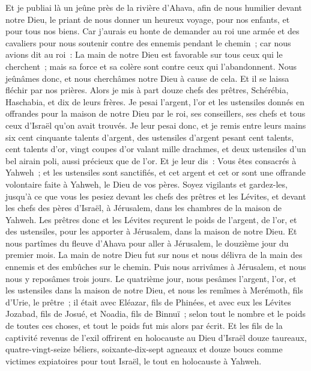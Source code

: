 \begin{multicols}{2}
Et je publiai là un jeûne près de la rivière d'Ahava, afin de nous humilier devant notre Dieu, le priant de nous donner un heureux voyage, pour nos enfants, et pour tous nos biens.
Car j'aurais eu honte de demander au roi une armée et des cavaliers pour nous soutenir contre des ennemis pendant le chemin~; car nous avions dit au roi~: La main de notre Dieu est favorable sur tous ceux qui le cherchent~; mais sa force et sa colère sont contre ceux qui l'abandonnent.
Nous jeûnâmes donc, et nous cherchâmes notre Dieu à cause de cela. Et il se laissa fléchir par nos prières.
Alors je mis à part douze chefs des prêtres, Schérébia, Haschabia, et dix de leurs frères.
Je pesai l'argent, l'or et les ustensiles donnés en offrandes pour la maison de notre Dieu par le roi, ses conseillers, ses chefs et tous ceux d'Israël qu'on avait trouvés.
Je leur pesai donc, et je remis entre leurs mains six cent cinquante talents d'argent, des ustensiles d'argent pesant cent talents, cent talents d'or,
vingt coupes d'or valant mille drachmes, et deux ustensiles d'un bel airain poli, aussi précieux que de l'or.
Et je leur dis~: Vous êtes consacrés à Yahweh~; et les ustensiles sont sanctifiés, et cet argent et cet or sont une offrande volontaire faite à Yahweh, le Dieu de vos pères.
Soyez vigilants et gardez-les, jusqu'à ce que vous les pesiez devant les chefs des prêtres et les Lévites, et devant les chefs des pères d'Israël, à Jérusalem, dans les chambres de la maison de Yahweh.
Les prêtres donc et les Lévites reçurent le poids de l'argent, de l'or, et des ustensiles, pour les apporter à Jérusalem, dans la maison de notre Dieu.
Et nous partîmes du fleuve d'Ahava pour aller à Jérusalem, le douzième jour du premier mois. La main de notre Dieu fut sur nous et nous délivra de la main des ennemis et des embûches sur le chemin.
Puis nous arrivâmes à Jérusalem, et nous nous y reposâmes trois jours.
Le quatrième jour, nous pesâmes l'argent, l'or, et les ustensiles dans la maison de notre Dieu, et nous les remîmes à Merémoth, fils d'Urie, le prêtre~; il était avec Eléazar, fils de Phinées, et avec eux les Lévites Jozabad, fils de Josué, et Noadia, fils de Binnuï~;
selon tout le nombre et le poids de toutes ces choses, et tout le poids fut mis alors par écrit.
Et les fils de la captivité revenus de l'exil offrirent en holocauste au Dieu d'Israël douze taureaux, quatre-vingt-seize béliers, soixante-dix-sept agneaux et douze boucs comme victimes expiatoires pour tout Israël, le tout en holocauste à Yahweh.

\end{multicols}
